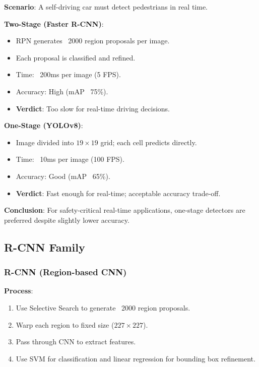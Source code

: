 \documentclass[11pt,a4paper]{article}
\begin{document}
\begin{tcolorbox}[colback=green!5!white,colframe=green!75!black,title=\textbf{Worked Example 9: Two-Stage vs One-Stage Comparison}]
\textbf{Scenario}: A self-driving car must detect pedestrians in real time.

\textbf{Two-Stage (Faster R-CNN)}:
\begin{itemize}
    \item RPN generates ~2000 region proposals per image.
    \item Each proposal is classified and refined.
    \item Time: ~200ms per image (5 FPS).
    \item Accuracy: High (mAP ~75\%).
    \item \textbf{Verdict}: Too slow for real-time driving decisions.
\end{itemize}

\textbf{One-Stage (YOLOv8)}:
\begin{itemize}
    \item Image divided into $19 \times 19$ grid; each cell predicts directly.
    \item Time: ~10ms per image (100 FPS).
    \item Accuracy: Good (mAP ~65\%).
    \item \textbf{Verdict}: Fast enough for real-time; acceptable accuracy trade-off.
\end{itemize}

\textbf{Conclusion}: For safety-critical real-time applications, one-stage detectors are preferred despite slightly lower accuracy.
\end{tcolorbox}

\subsection{R-CNN Family}

\subsubsection{R-CNN (Region-based CNN)}

\textbf{Process}:
\begin{enumerate}
    \item Use Selective Search to generate ~2000 region proposals.
    \item Warp each region to fixed size ($227 \times 227$).
    \item Pass through CNN to extract features.
    \item Use SVM for classification and linear regression for bounding box refinement.
\end{enumerate}
\end{document}

